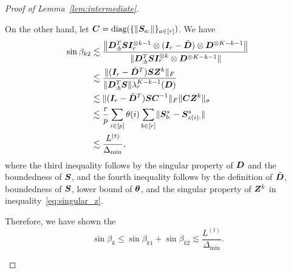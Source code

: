 \documentclass[lettersize,onecolumn,journal]{IEEEtran}
\theoremstyle{definition}
\theoremstyle{definition}
\def\fixme#1#2{\textbf{\color{red}[FIXME (#1): #2]}}
\begin{document}
\begin{proof}[Proof of Lemma~\ref{lem:intermediate}]
\begin{enumerate}
    On the other hand, let $\bm C = \text{diag}(\{\lVert\bm S_{a:}\rVert\}_{a \in [r]})$. We have 
    \begin{align}
        \sin \beta_{k2} &\lesssim \frac{ \left\lVert\bm{D}_{:b}^{T} \bm S \bm I_r^{\otimes k-1} \otimes (\bm I_r - \tilde {\bm{D}}) \otimes \bm{D}^{\otimes K-k-1} \right\rVert }{\lVert\bm{D}_{:b}^{T} \bm S \bm I_r^{\otimes k} \otimes \bm{D}^{\otimes K-k-1} \rVert  }\\
        & \lesssim \frac{ \lVert(\bm I_r - \tilde {\bm{D}}^T) \bm S \bm Z^k\rVert_F }{\lVert\bm{D}_{:b}^{T} \bm S\rVert \lambda_r^{K-k-1}(\bm{D})} \\
        & \lesssim \lVert(\bm I_r - \tilde {\bm{D}}^T) \bm S \bm C^{-1} \rVert_F \lVert\bm C \bm Z^k\rVert_{\sigma}\\
        & \lesssim \frac{r}{p} \sum_{i \in [p]} \theta(i) \sum_{b \in [r]} \lVert\bm S_{b:}^s - \bm S_{z(i):}^s\rVert \\
        & \lesssim \frac{L^{(t)}}{\Delta_{\min}}, 
    \end{align}
    where the third inequality follows by the singular property of $\bm{D}$ and the boundedness of $\bm S$, and the fourth inequality follows by the definition of $\tilde {\bm{D}}$, boundedness of $\bm S$, lower bound of $\boldsymbol{\theta}$, and the singular property of $\bm Z^k$ in inequality~\eqref{eq:singular_z}. 
    
    Therefore, we have shown the 
    \begin{equation}
        \sin \beta_k \leq \sin \beta_{k1} + \sin \beta_{k2} \lesssim \frac{L^{(t)}}{\Delta_{\min}}.
    \end{equation}

    
   
    
    

\end{enumerate}
\end{proof}
\end{document}
